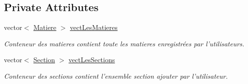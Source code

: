 \subsection*{Private Attributes}
\begin{DoxyCompactItemize}
\item 
vector$<$ \hyperlink{classMatiere}{Matiere} $>$ \hyperlink{classApplication_ab1b52fb83be037606ddd28be0b123c82}{vect\+Les\+Matieres}
\begin{DoxyCompactList}\small\item\em Conteneur des matieres contient toute les matieres enregistrées par l'utilisateurs. \end{DoxyCompactList}\item 
vector$<$ \hyperlink{classSection}{Section} $>$ \hyperlink{classApplication_a14edb6de19528fd1582a9c30fbe5b765}{vect\+Les\+Sections}
\begin{DoxyCompactList}\small\item\em Conteneur des sections contient l'ensemble section ajouter par l'utilisateur. \end{DoxyCompactList}\end{DoxyCompactItemize}


